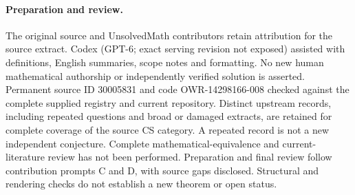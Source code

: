 \documentclass[11pt]{article}
\begin{document}
\paragraph{Preparation and review.}
The original source and UnsolvedMath contributors retain attribution for the source extract. Codex (GPT-6; exact serving revision not exposed) assisted with definitions, English summaries, scope notes and formatting. No new human mathematical authorship or independently verified solution is asserted. Permanent source ID 30005831 and code OWR-14298166-008 checked against the complete supplied registry and current repository. Distinct upstream records, including repeated questions and broad or damaged extracts, are retained for complete coverage of the source CS category. A repeated record is not a new independent conjecture. Complete mathematical-equivalence and current-literature review has not been performed. Preparation and final review follow contribution prompts C and D, with source gaps disclosed. Structural and rendering checks do not establish a new theorem or open status.
\label{end:30005831}
\end{document}

